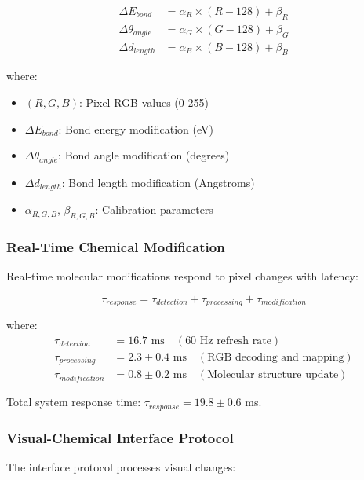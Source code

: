 \begin{align}
\Delta E_{bond} &= \alpha_R \times (R - 128) + \beta_R \\
\Delta \theta_{angle} &= \alpha_G \times (G - 128) + \beta_G \\
\Delta d_{length} &= \alpha_B \times (B - 128) + \beta_B
\end{align}

where:
\begin{itemize}
\item $(R, G, B)$: Pixel RGB values (0-255)
\item $\Delta E_{bond}$: Bond energy modification (eV)
\item $\Delta \theta_{angle}$: Bond angle modification (degrees)
\item $\Delta d_{length}$: Bond length modification (Angstroms)
\item $\alpha_{R,G,B}$, $\beta_{R,G,B}$: Calibration parameters
\end{itemize}

\subsubsection{Real-Time Chemical Modification}

Real-time molecular modifications respond to pixel changes with latency:

\begin{equation}
\tau_{response} = \tau_{detection} + \tau_{processing} + \tau_{modification}
\end{equation}

where:
\begin{align}
\tau_{detection} &= 16.7 \text{ ms} \quad (\text{60 Hz refresh rate}) \\
\tau_{processing} &= 2.3 \pm 0.4 \text{ ms} \quad (\text{RGB decoding and mapping}) \\
\tau_{modification} &= 0.8 \pm 0.2 \text{ ms} \quad (\text{Molecular structure update})
\end{align}

Total system response time: $\tau_{response} = 19.8 \pm 0.6$ ms.

\subsubsection{Visual-Chemical Interface Protocol}

The interface protocol processes visual changes:

